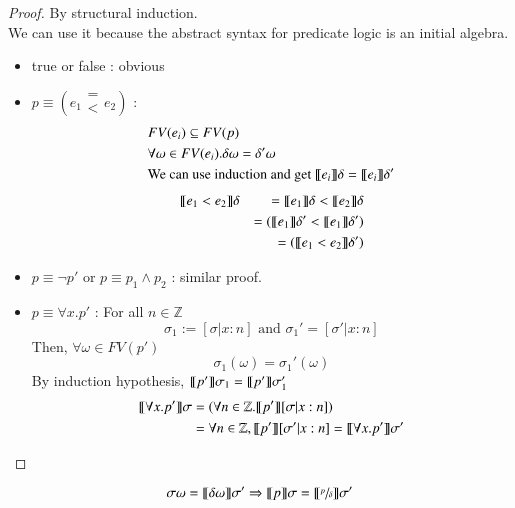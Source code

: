 \documentclass{report}[12pt]
\begin{document}
\begin{proof}
    By structural induction. \\
    We can use it because the abstract syntax for predicate logic is an initial algebra.
    \begin{itemize}
        \item true or false :  obvious
        \item $p\equiv (e_1 \begin{array}{c} =\\<\end{array}e_2)$ :
        \begin{align*}
            &FV(e_i) \subseteq FV(p) \\
            &\forall \omega \in FV(e_i). \delta \omega = \delta' \omega \\
            &\text{We can use induction and get }\llbracket  e_i  \rrbracket \delta = \llbracket  e_i  \rrbracket \delta'
        \end{align*}
        \begin{align*}
            &\llbracket  e_1 < e_2  \rrbracket \delta &= \llbracket  e_1  \rrbracket \delta < \llbracket  e_2  \rrbracket \delta \\
            & &= (\llbracket  e_1  \rrbracket \delta' < \llbracket  e_1  \rrbracket \delta') \\
            & &= (\llbracket  e_1 < e_2  \rrbracket \delta')
        \end{align*}
        \item $p\equiv \neg p'$ or $p\equiv p_1 \wedge p_2$ : similar proof.
        \item $p\equiv \forall x.p'$ : For all $n \in \mathbb{Z}$
        \[\sigma_1 := [\sigma|x:n]\text{ and }\sigma_1'=[\sigma'|x:n]\]
        Then, $\forall \omega \in FV(p')$
        \[\sigma_1(\omega)=\sigma_1'(\omega)\]
        By induction hypothesis, $\llbracket  p'  \rrbracket \sigma_1 = \llbracket  p'  \rrbracket \sigma_1'$ \\
        \begin{align*}
            \llbracket  \forall x. p'  \rrbracket \sigma &= (\forall n \in \mathbb{Z}. \llbracket  p'  \rrbracket [\sigma|x:n]) \\
            &=\forall n \in \mathbb{Z}, \llbracket  p'  \rrbracket [\sigma' | x:n] = \llbracket  \forall x. p'  \rrbracket \sigma'
        \end{align*}
    \end{itemize}
\end{proof}
\begin{proposition}[Substitution]
    \[\sigma \omega = \llbracket  \delta \omega  \rrbracket \sigma' \Rightarrow \llbracket  p \rrbracket \sigma = \llbracket  \sfrac{p}{\delta}  \rrbracket \sigma'\]
\end{proposition}
\end{document}
